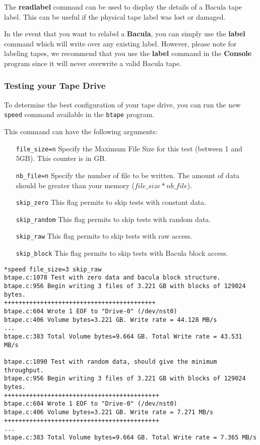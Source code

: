 The {\bf readlabel} command can be used to display the details of a Bacula
tape label. This can be useful if the physical tape label was lost or damaged.


In the event that you want to relabel a {\bf Bacula}, you can simply use the
{\bf label} command which will write over any existing label. However, please
note for labeling tapes, we recommend that you use the {\bf label} command in
the {\bf Console} program since it will never overwrite a valid Bacula tape.

\subsubsection*{Testing your Tape Drive}
\label{sec:btapespeed}

To determine the best configuration of your tape drive, you can run the new
\texttt{speed} command available in the \texttt{btape} program.

This command can have the following arguments:
\begin{itemize}
\item[\texttt{file\_size=n}] Specify the Maximum File Size for this test
  (between 1 and 5GB). This counter is in GB.
\item[\texttt{nb\_file=n}] Specify the number of file to be written. The amount
  of data should be greater than your memory ($file\_size*nb\_file$).
\item[\texttt{skip\_zero}] This flag permits to skip tests with constant
  data.
\item[\texttt{skip\_random}] This flag permits to skip tests with random
  data.
\item[\texttt{skip\_raw}] This flag permits to skip tests with raw access.
\item[\texttt{skip\_block}] This flag permits to skip tests with Bacula block
  access.
\end{itemize}

\begin{verbatim}
*speed file_size=3 skip_raw
btape.c:1078 Test with zero data and bacula block structure.
btape.c:956 Begin writing 3 files of 3.221 GB with blocks of 129024 bytes.
++++++++++++++++++++++++++++++++++++++++++
btape.c:604 Wrote 1 EOF to "Drive-0" (/dev/nst0)
btape.c:406 Volume bytes=3.221 GB. Write rate = 44.128 MB/s
...
btape.c:383 Total Volume bytes=9.664 GB. Total Write rate = 43.531 MB/s

btape.c:1090 Test with random data, should give the minimum throughput.
btape.c:956 Begin writing 3 files of 3.221 GB with blocks of 129024 bytes.
+++++++++++++++++++++++++++++++++++++++++++
btape.c:604 Wrote 1 EOF to "Drive-0" (/dev/nst0)
btape.c:406 Volume bytes=3.221 GB. Write rate = 7.271 MB/s
+++++++++++++++++++++++++++++++++++++++++++
...
btape.c:383 Total Volume bytes=9.664 GB. Total Write rate = 7.365 MB/s

\end{verbatim}

